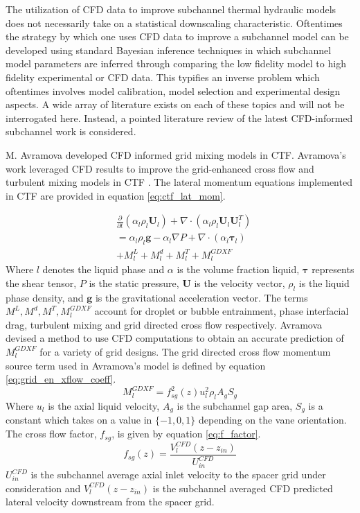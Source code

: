 The utilization of CFD data to improve subchannel thermal hydraulic models does not necessarily take on a statistical downscaling characteristic.  Oftentimes the strategy by which one uses CFD data to improve a subchannel model can be developed using standard Bayesian inference techniques in which subchannel model parameters are inferred through comparing the low fidelity model to high fidelity experimental or CFD data.  This typifies an inverse problem which oftentimes involves  model calibration, model selection and experimental design aspects.  A wide array of literature exists on each of these topics and will not be interrogated here.  Instead, a pointed literature review of the latest CFD-informed subchannel work is considered.


 M. Avramova developed CFD informed grid mixing models in CTF.  Avramova's work leveraged CFD results to improve the grid-enhanced cross flow and turbulent mixing models in CTF \cite{avramova2007}.  The lateral momentum equations implemented in CTF are provided in equation \ref{eq:ctf_lat_mom}.

    	\begin{align}
    	& \frac{\partial }{\partial t}(\alpha_l \rho_l \mathbf U_l)
    	+ \nabla \cdot (\alpha_l \rho_l \mathbf U_l \mathbf U_l^T) \nonumber \\
    	&= \alpha_l \rho_l \mathbf{g} - \alpha_l \nabla P + 
    	\nabla \cdot (\alpha_l \bm{\tau}_l) \nonumber \\
    	&+ M^L_l + M^d_l + M^T_l + M_l^{GDXF}
        \label{eq:ctf_lat_mom}
    	\end{align}
Where $l$ denotes the liquid phase and $\alpha$ is the volume fraction liquid, $\bm \tau$ represents the shear tensor, $P$ is the static pressure, $\mathbf U$ is the velocity vector, $\rho_l$ is the liquid phase density, and $\mathbf g$ is the gravitational acceleration vector.  The terms $M^L, M^d, M^T, M_l^{GDXF}$ account for droplet or bubble entrainment, phase interfacial drag, turbulent mixing and grid directed cross flow respectively.  Avramova devised a method to use CFD computations to obtain an accurate prediction of $M_l^{GDXF}$ for a variety of grid designs.
The grid directed cross flow momentum source term used in Avramova's model is defined by equation \ref{eq:grid_en_xflow_coeff}.
    	\begin{equation}
    	M_l^{GDXF} = f^2_{sg}(z) u_l^2 \rho_l A_g S_g
        \label{eq:grid_en_xflow_coeff}
    	\end{equation}
        Where $u_l$ is the axial liquid velocity, $A_g$ is the subchannel gap area, $S_g$ is a constant which takes on a value in $\{-1, 0, 1\}$ depending on the vane orientation. The cross flow factor, $f_{sg}$, is given by equation \ref{eq:f_factor}.
    	\begin{equation}
    	f_{sg}(z) = \frac{V^{CFD}_l(z-z_{in})}{U^{CFD}_{in}}
        \label{eq:f_factor}
    	\end{equation}
        $U^{CFD}_{in}$ is the subchannel average axial inlet velocity to the spacer grid under consideration and $V^{CFD}_l(z-z_{in})$ is the subchannel averaged CFD predicted lateral velocity downstream from the spacer grid.

